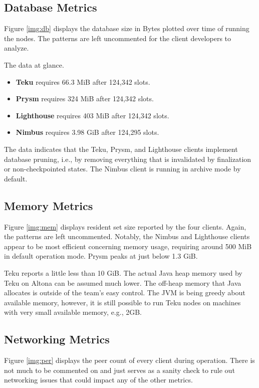 \documentclass[twoside,twocolumn]{article}
\begin{document}
\subsection{Database Metrics}
Figure \ref{img:db} displays the database size in Bytes plotted over time of running the nodes. The patterns are left uncommented for the client developers to analyze.\par

The data at glance.
\begin{itemize}
\item \textbf{Teku} requires 66.3 MiB after 124,342 slots.
\item \textbf{Prysm} requires 324 MiB after 124,342 slots.
\item \textbf{Lighthouse} requires 403 MiB after 124,342 slots.
\item \textbf{Nimbus} requires 3.98 GiB after 124,295 slots.
\end{itemize}

The data indicates that the Teku, Prysm, and Lighthouse clients implement database pruning, i.e., by removing everything that is invalidated by finalization or non-checkpointed states. The Nimbus client is running in archive mode by default.\par

\subsection{Memory Metrics}
Figure \ref{img:mem} displays resident set size reported by the four clients. Again, the patterns are left uncommented. Notably, the Nimbus and Lighthouse clients appear to be most efficient concerning memory usage, requiring around 500 MiB in default operation mode. Prysm peaks at just below 1.3 GiB.\par

Teku reports a little less than 10 GiB. The actual Java heap memory used by Teku on Altona can be assumed much lower. The off-heap memory that Java allocates is outside of the team's easy control. The JVM is being greedy about available memory, however, it is still possible to run Teku nodes on machines with very small available memory, e.g., 2GB.\par

\subsection{Networking Metrics}
\label{sec:perf:p2p}
Figure \ref{img:per} displays the peer count of every client during operation. There is not much to be commented on and just serves as a sanity check to rule out networking issues that could impact any of the other metrics.\par
\end{document}
